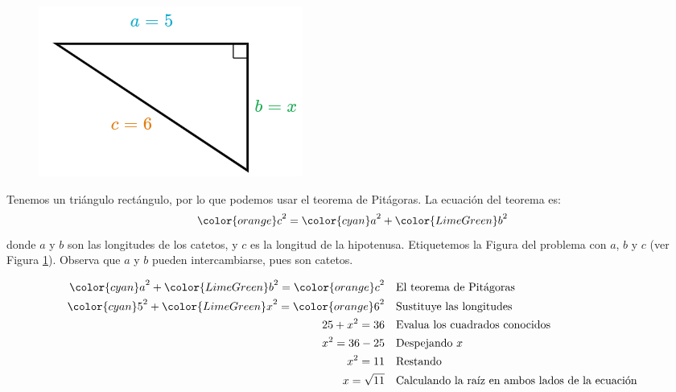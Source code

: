 \begin{minipage}[t][][t]{0.6\textwidth}
    \begin{solutionbox}{9cm}
        \begin{minipage}{0.4\textwidth}
            \begin{figure}[H]
                \centering
                \includegraphics[width=0.9\linewidth]{../images/lados_pitagoras_38a.png}
                \caption{}
                \label{fig:lados_pitagoras_38a}
            \end{figure}
        \end{minipage}\hfill
        \begin{minipage}{0.55\textwidth}
            Tenemos un triángulo rectángulo, por lo que podemos usar el teorema de Pitágoras.
            La ecuación del teorema es:
            \[{\color{orange}c}^2={\color{cyan}a}^2+{\color{LimeGreen}b}^2\]
            donde $a$ y $b$ son las longitudes de los catetos, y $c$ es la longitud de la hipotenusa.
            Etiquetemos la Figura del problema con $a$, $b$ y $c$ (ver Figura \ref{fig:lados_pitagoras_38a}).
            Observa que $a$ y $b$ pueden intercambiarse, pues son catetos.
        \end{minipage}
        \begin{align*}
            {\color{cyan}a}^2+{\color{LimeGreen}b}^2  ={\color{orange}c}^2 & \text{\quad El teorema de Pitágoras}                          \\
            {\color{cyan}5}^2+{\color{LimeGreen}x}^2  ={\color{orange}6}^2 & \text{\quad Sustituye las longitudes}                         \\
            25+x^2   =36                                                   & \text{\quad Evalua los cuadrados conocidos}                   \\
            x^2=36-25                                                      & \text{\quad Despejando } x                                    \\
            x^2=11                                                         & \text{\quad Restando}                                         \\
            x=\sqrt{11}                                                    & \text{\quad Calculando la raíz en ambos lados de la ecuación} \\
        \end{align*}
    \end{solutionbox}
\end{minipage}
